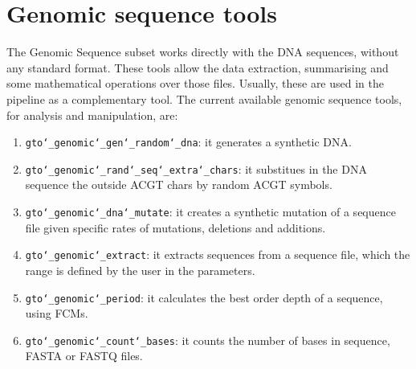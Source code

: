 \chapter{Genomic sequence tools}
\label{gst}
The Genomic Sequence subset works directly with the DNA sequences, without any standard format. These tools allow the data extraction, summarising and some mathematical operations over those files. Usually, these are used in the pipeline as a complementary tool. The current available genomic sequence tools, for analysis and manipulation, are:
\begin{enumerate}

\item \texttt{gto\char`_genomic\char`_gen\char`_random\char`_dna}: it generates a synthetic DNA.

\item \texttt{gto\char`_genomic\char`_rand\char`_seq\char`_extra\char`_chars}: it substitues in the DNA sequence the outside ACGT chars by random ACGT symbols.

\item \texttt{gto\char`_genomic\char`_dna\char`_mutate}: it creates a synthetic mutation of a sequence file given specific rates of mutations, deletions and additions.

\item \texttt{gto\char`_genomic\char`_extract}: it extracts sequences from a sequence file, which the range is defined by the user in the parameters.

\item \texttt{gto\char`_genomic\char`_period}: it calculates the best order depth of a sequence, using FCMs.

\item \texttt{gto\char`_genomic\char`_count\char`_bases}: it counts the number of bases in sequence, FASTA or FASTQ files.
\end{enumerate}








